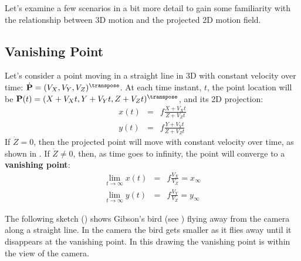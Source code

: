 
Let's examine a few scenarios in a bit more detail to gain some familiarity with the relationship between 3D motion and the projected 2D motion field.

\subsection{Vanishing Point}

Let's consider a point moving in a straight line in 3D with constant velocity over time: $\dot{\mathbf{P}} = (V_X, V_Y, V_Z)^\transpose$. At each time instant, $t$, the point location will be $\mathbf{P}(t) = (X+V_Xt, Y+V_Yt, Z+V_Zt)^\transpose$, and its 2D projection:
\begin{eqnarray}
    x(t) & = & f \frac{X + V_X t}{Z + V_Z t}\\
    y(t) & = & f \frac{Y + V_Y t}{Z + V_Z t}
\end{eqnarray}
If $\dot{Z}=0$, then the projected point will move with constant velocity over time, as shown in \eqn{\ref{eq:parallelmotion}}. If $\dot{Z} \neq  0$, then, as time goes to infinity, the point will converge to a {\bf vanishing point}:
\begin{eqnarray}
    \lim_{t \to \infty} x(t)  & = & f \frac{V_X}{V_Z} = x_{\infty}\\
    \lim_{t \to \infty} y(t) & = & f \frac{V_Y}{V_Z} = y_{\infty}
    \label{eq:motionvanishingpoint}
\end{eqnarray}


The following sketch (\fig{\ref{fig:flying_bird}}) shows Gibson's bird (see \fig{\ref{fig:gibson_bird}}) flying away from the camera along a straight line. In the camera the bird gets smaller as it flies away until it disappears at the vanishing point. In this drawing the vanishing point is within the view of the camera.

